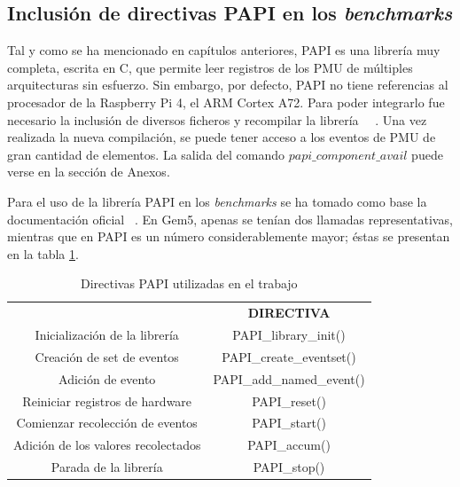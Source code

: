 \subsection{Inclusión de directivas \ac{PAPI} en los \textit{benchmarks}}

Tal y como se ha mencionado en capítulos anteriores, PAPI es una librería muy completa, escrita en C, que permite leer registros de los PMU de múltiples arquitecturas sin esfuerzo. Sin embargo, por defecto, PAPI no tiene referencias al procesador de la Raspberry Pi 4, el \ac{ARM} Cortex A72. Para poder integrarlo fue necesario la inclusión de diversos ficheros y recompilar la librería ~\cite{papi-stackoverflow-referencia}~\cite{papi-github-referencia}. Una vez realizada la nueva compilación, se puede tener acceso a los eventos de PMU de gran cantidad de elementos. La salida del comando $papi\_component\_avail$ puede verse en la sección de Anexos.

Para el uso de la librería \ac{PAPI} en los \textit{benchmarks} se ha tomado como base la documentación oficial ~\cite{papi-documentacion}. En Gem5, apenas se tenían dos llamadas representativas, mientras que en PAPI es un número considerablemente mayor; éstas se presentan en la tabla \ref{directivasPAPI}.

\begin{table}[H]
    \centering
    \footnotesize
    \begin{tabular}{|cc|}
        \hline
        \rowcolor[HTML]{9B9B9B} 
        \multicolumn{2}{|c|}{\cellcolor[HTML]{9B9B9B}\textbf{DIRECTIVAS PAPI UTILIZADAS}} \\ \hline
        \rowcolor[HTML]{C0C0C0} 
        \multicolumn{1}{|c|}{\cellcolor[HTML]{C0C0C0}\textbf{DESCRIPCION}}  & \textbf{DIRECTIVA}         \\ \hline
        \multicolumn{1}{|c|}{Inicialización de la librería}                 & PAPI\_library\_init()      \\ \hline
        \multicolumn{1}{|c|}{Creación de set de eventos}                    & PAPI\_create\_eventset()   \\ \hline
        \multicolumn{1}{|c|}{Adición de evento}                             & PAPI\_add\_named\_event()  \\ \hline
        \multicolumn{1}{|c|}{Reiniciar registros de hardware}               & PAPI\_reset()              \\ \hline
        \multicolumn{1}{|c|}{Comienzar recolección de eventos}              & PAPI\_start()              \\ \hline
        \multicolumn{1}{|c|}{Adición de los valores recolectados}           & PAPI\_accum()              \\ \hline
        \multicolumn{1}{|c|}{Parada de la librería}                         & PAPI\_stop()               \\ \hline
    \end{tabular}
\caption{Directivas PAPI utilizadas en el trabajo}
\label{directivasPAPI}
\end{table}

